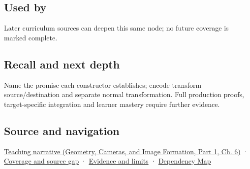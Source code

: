 \subsection{Used by}\label{appendix-380a220e2529-used-by}

\hypertarget{appendix-380a220e2529-used-by}{}

Later curriculum sources can deepen this same node; no future coverage is marked complete.

\subsection{Recall and next depth}\label{appendix-380a220e2529-recall-and-next-depth}

\hypertarget{appendix-380a220e2529-recall-and-next-depth}{}

Name the promise each constructor establishes; encode transform source/destination and separate normal transformation. Full production proofs, target-specific integration and learner mastery require further evidence.

\subsection{Source and navigation}\label{appendix-380a220e2529-source-and-navigation}

\hypertarget{appendix-380a220e2529-source-and-navigation}{}

\href{../03-Geometry-Cameras-and-Image-Formation-P01/main.pdf\#02-foundations-ii-ch037-types-can-remember-the-promises-that-three-components-forget}{Teaching narrative (Geometry, Cameras, and Image Formation, Part 1, Ch. 6)} · \hyperref[appendix-fd090d982a15-phase-6---parts-501-600]{Coverage and source gap} · \hyperref[appendix-a103e7846d21-phase-6---source-analysis-and-verification]{Evidence and limits} · \hyperref[appendix-4ad47bdd269a]{Dependency Map}
